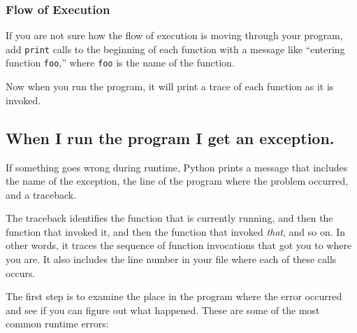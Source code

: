 \documentclass[10pt]{book}
\begin{document}
\subsubsection{Flow of Execution}

If you are not sure how the flow of execution is moving through
your program, add {\tt print} calls to the beginning of each
function with a message like ``entering function {\tt foo},'' where
{\tt foo} is the name of the function.

Now when you run the program, it will print a trace of each
function as it is invoked.


\subsection{When I run the program I get an exception.}

If something goes wrong during runtime, Python
prints a message that includes the name of the
exception, the line of the program where the problem occurred,
and a traceback.


The traceback identifies the function that is currently running,
and then the function that invoked it, and then the function that
invoked {\em that}, and so on.  In other words, it traces the
sequence of function invocations that got you to where you are.  It
also includes the line number in your file where each of these
calls occurs.

The first step is to examine the place in the program where
the error occurred and see if you can figure out what happened.
These are some of the most common runtime errors:
\end{document}
